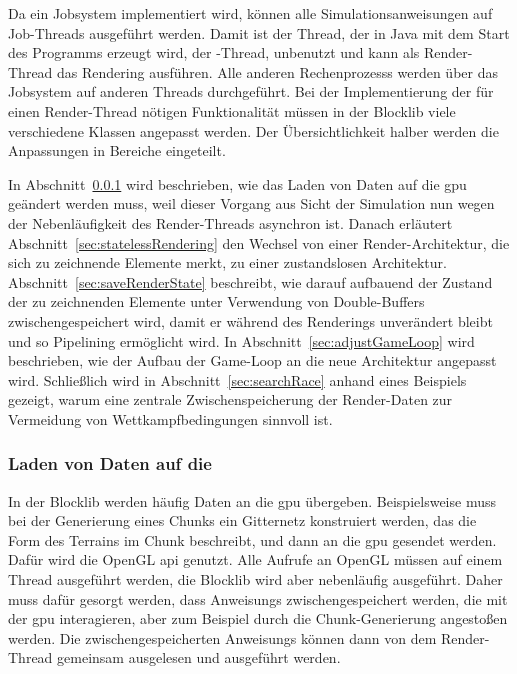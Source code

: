 Da ein Jobsystem implementiert wird, können alle Simulationsanweisungen auf Job-Threads ausgeführt werden. Damit ist der Thread, der in Java mit dem Start des Programms erzeugt wird, der -Thread, unbenutzt und kann als Render-Thread das Rendering ausführen. Alle anderen \glspl{Rechenprozess} werden über das Jobsystem auf anderen Threads durchgeführt. Bei der Implementierung der für einen Render-Thread nötigen Funktionalität müssen in der Blocklib viele verschiedene Klassen angepasst werden. Der Übersichtlichkeit halber werden die Anpassungen in Bereiche eingeteilt. 

In Abschnitt~\ref{sec:loader} wird beschrieben, wie das Laden von Daten auf die \ac{gpu} geändert werden muss, weil dieser Vorgang aus Sicht der Simulation nun wegen der Nebenläufigkeit des Render-Threads asynchron ist. Danach erläutert Abschnitt~\ref{sec:statelessRendering} den Wechsel von einer Render-Architektur, die sich zu zeichnende Elemente merkt, zu einer zustandslosen Architektur. Abschnitt~\ref{sec:saveRenderState} beschreibt, wie darauf aufbauend der Zustand der zu zeichnenden Elemente unter Verwendung von Double-Buffers zwischengespeichert wird, damit er während des Renderings unverändert bleibt und so Pipelining ermöglicht wird. In Abschnitt~\ref{sec:adjustGameLoop} wird beschrieben, wie der Aufbau der Game-Loop an die neue Architektur angepasst wird. Schließlich wird in Abschnitt~\ref{sec:searchRace} anhand eines Beispiels gezeigt, warum eine zentrale Zwischenspeicherung der Render-Daten zur Vermeidung von Wettkampfbedingungen sinnvoll ist.

\subsubsection{Laden von Daten auf die }\label{sec:loader}
In der Blocklib werden häufig Daten an die \ac{gpu} übergeben. Beispielsweise muss bei der Generierung eines Chunks ein Gitternetz konstruiert werden, das die Form des Terrains im Chunk beschreibt, und dann an die \ac{gpu} gesendet werden. Dafür wird die OpenGL \acs{api} genutzt. Alle Aufrufe an OpenGL müssen auf einem Thread ausgeführt werden, die Blocklib wird aber nebenläufig ausgeführt. Daher muss dafür gesorgt werden, dass \glspl{Anweisung} zwischengespeichert werden, die mit der \ac{gpu} interagieren, aber zum Beispiel durch die Chunk-Generierung angestoßen werden. Die zwischengespeicherten \glspl{Anweisung} können dann von dem Render-Thread gemeinsam ausgelesen und ausgeführt werden. 

